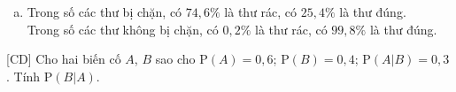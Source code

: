 \begin{bt}
{\begin{enumerate}[a)]
	\begin{itemize}
		\item Tính $P(\overline{B} \mid A)$: Ta có $(\overline{B} \mid A)=1-P(B \mid A)=0{,}05$.
		\item Tính $P(\overline{B} \mid \overline{A})$: Ta có $P(\overline{B} \mid \overline{A})=1-P(B \mid \overline{A})=0{,}99$.
	\end{itemize}
	Vậy $P(\overline{A}\mid \overline{B}) = \dfrac{P(\overline{A})\cdot P(\overline{B}\mid \overline{A})}{P(\overline{A})\cdot P(\overline{B}\mid \overline{A}) + P(A)\cdot P(\overline{B} \mid A)}=\dfrac{0{,}97\cdot 0{,}99}{0{,}97\cdot 0{,}99+0{,}03\cdot 0{,}05}=\dfrac{3201}{3206}\approx 0{,}998$.\\
	Vậy xác suất để chọn ngẫu nhiên một thư không bị chặn mà thư đó là thư đúng là khoảng $0{,}998$.
	\item Trong số các thư bị chặn, có $74{,}6 \%$ là thư rác, có $25{,}4 \%$ là thư đúng. \\
	Trong số các thư không bị chặn, có $0{,}2 \%$ là thư rác, có $99{,}8 \%$ là thư đúng.
	\end{enumerate}
}

\end{bt}

\begin{bt}%
[CD]%
	Cho hai biến cố $A$, $B$ sao cho $\mathrm{P}(A) = 0{,}6$; $\mathrm{P}(B)=0{,}4$; $\mathrm{P}(A|B) = 0{,}3$. Tính $\mathrm{P}(B|A)$.
\end{bt}

